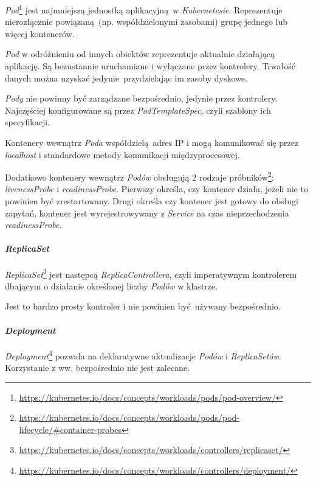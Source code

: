 \documentclass[a4paper,12pt,twoside,openany]{report}
\DeclareRobustCommand{\href}[2]{#2\footnote{\url{#1}}}
\begin{document}
\href{https://kubernetes.io/docs/concepts/workloads/pods/pod-overview/}{\emph{Pod}}
jest najmniejszą jednostką aplikacyjną~w \emph{Kubernetesie}.
Reprezentuje nierozłącznie powiązaną~(np. współdzielonymi zasobami)
grupę jednego lub więcej kontenerów.

\emph{Pod} w odróżnieniu od innych obiektów reprezentuje aktualnie
działającą aplikację. Są bezustannie uruchamiane i wyłączane przez
kontrolery. Trwałość danych można uzyskać jedynie~przydzielając im
zasoby dyskowe.

\emph{Pody} nie powinny być zarządzane bezpośrednio, jedynie przez
kontrolery. Najczęściej konfigurowane są przez \emph{PodTemplateSpec},
czyli szablony ich specyfikacji.

Kontenery wewnątrz \emph{Poda} współdzielą~adres IP i mogą komunikować
się przez \emph{localhost} i standardowe metody komunikacji
międzyprocesowej.

Dodatkowo kontenery wewnątrz \emph{Podów} obsługują 2 rodzaje
\href{https://kubernetes.io/docs/concepts/workloads/pods/pod-lifecycle/\#container-probes}{próbników}:
\emph{livenessProbe} i \emph{readinessProbe}. Pierwszy określa, czy
kontener działa, jeżeli nie to powinien być zrestartowany. Drugi określa
czy kontener jest gotowy do obsługi zapytań, kontener jest
wyrejestrowywany z \emph{Service} na czas nieprzechodzenia
\emph{readinessProbe}.

\hypertarget{replicaset}{%
\paragraph{\texorpdfstring{\emph{ReplicaSet}}{ReplicaSet}}\label{replicaset}}

\href{https://kubernetes.io/docs/concepts/workloads/controllers/replicaset/}{\emph{ReplicaSet}}
jest następcą \emph{ReplicaControllera}, czyli imperatywnym kontrolerem
dbającym o działanie określonej liczby \emph{Podów} w klastrze.

Jest to bardzo prosty kontroler i nie powinien być~używany bezpośrednio.

\hypertarget{deployment}{%
\paragraph{\texorpdfstring{\emph{Deployment}}{Deployment}}\label{deployment}}

\href{https://kubernetes.io/docs/concepts/workloads/controllers/deployment/}{\emph{Deployment}}
pozwala na deklaratywne aktualizacje \emph{Podów} i \emph{ReplicaSetów}.
Korzystanie z ww. bezpośrednio nie jest zalecane.
\end{document}
